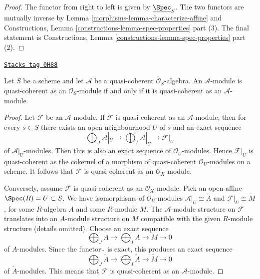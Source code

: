 \begin{proof}

The functor from right to left is given by $\underline{\Spec}_S$.
The two functors are mutually inverse by
Lemma \ref{morphisms-lemma-characterize-affine} and
Constructions, Lemma \ref{constructions-lemma-spec-properties} part (3).
The final statement is
Constructions, Lemma \ref{constructions-lemma-spec-properties} part (2).
\end{proof}

\begin{lemma}
\label{morphisms-lemma-quasi-coherence-scalar-restriction}
\href{https://stacks.math.columbia.edu/tag/0H88}{\texttt{Stacks tag 0H88}}

\begin{reference}
\cite[I, Proposition 9.6.1]{EGA}
\end{reference}
Let $S$ be a scheme and let $\mathcal{A}$ be a quasi-coherent
$\mathcal{O}_S$-algebra. An $\mathcal{A}$-module is
quasi-coherent as an $\mathcal{O}_S$-module if and only if
it is quasi-coherent as an $\mathcal{A}$-module.
\end{lemma}

\begin{proof}
Let $\mathcal{F}$ be an $\mathcal{A}$-module.
If $\mathcal{F}$ is quasi-coherent as an $\mathcal{A}$-module, then
for every $s \in S$ there exists an open neighbourhood $U$ of $s$
and an exact sequence
$$
\bigoplus\nolimits_J\mathcal{A}|_U\to
\bigoplus\nolimits_I\mathcal{A}|_U\to
\mathcal{F}|_U
$$
of $\mathcal{A}|_U$-modules.
Then this is also an exact sequence of $\mathcal{O}_U$-modules.
Hence $\mathcal{F}|_U$ is quasi-coherent as the cokernel of a morphism
of quasi-coherent $\mathcal{O}_U$-modules on a scheme. It follows
that $\mathcal{F}$ is quasi-coherent as an $\mathcal{O}_X$-module.

\medskip\noindent
Conversely, assume $\mathcal{F}$ is quasi-coherent as an $\mathcal{O}_X$-module.
Pick an open affine $\Spec(R) = U \subset S$. We have isomorphisms of
$\mathcal{O}_U$-modules $\mathcal{A}|_U \cong \widetilde{A}$ and
$\mathcal{F}|_U \cong \widetilde{M}$, for some $R$-algebra $A$
and some $R$-module $M$. The $\mathcal{A}$-module structure on $\mathcal{F}$
translates into an $A$-module structure on $M$ compatible with the
given $R$-module structure (details omitted). Choose an exact sequence
$$
\bigoplus\nolimits_J A \to
\bigoplus\nolimits_I A \to
M \to 0
$$
of $A$-modules. Since the functor $\widetilde{\ }$ is exact, this
produces an exact sequence
$$
\bigoplus\nolimits_J \widetilde{A}\to
\bigoplus\nolimits_I \widetilde{A}\to
\widetilde{M} \to 0
$$
of $\widetilde{A}$-modules. This means that
$\mathcal{F}$ is quasi-coherent as an $\mathcal{A}$-module.
\end{proof}

